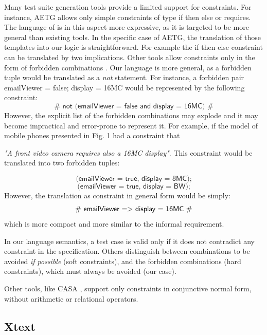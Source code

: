 \begin{tikzborder}{\cite{Gargantini16:validation}}
\begin{tikzborder}{\cite{gargantini_combinatorial_2017}}
\begin{tikzborder}{\cite{gargantini_combinatorial_2017}}
\begin{tikzborder}{\cite{garn2019}}
\begin{tikzborder}{\cite{arcaini2019achieving}}
\begin{tikzborder}{}
Many test suite generation tools provide a limited support for constraints. For instance, AETG \cite{AETG,Lott2005} allows only simple constraints of type \textsf{if then else} or \textsf{requires}. The language of \ctwedge is in this aspect more expressive, as it is targeted to be more general than existing tools. In the specific case of AETG, the translation of those templates into our logic is straightforward. For example the \textsf{if then else} constraint can be translated by two implications.
Other tools \cite{CohenISSTA07} allow constraints only in the form of forbidden combinations \cite{Golumbic:2011:GTC:2028636}. Our language is more general, as a forbidden tuple would be translated as a \textit{not} statement. For instance, a forbidden pair \textsf{emailViewer = false; display = 16MC} would be represented by the following constraint:
$$\textsf{\#\ not\ (emailViewer = false\ and\ display = 16MC)\ \#}$$
However, the explicit list of the forbidden combinations may explode and it may become impractical and error-prone to represent it. For example, if the model of mobile phones presented in Fig. 1 had a constraint that

\emph{"A front video camera requires also a 16MC display"}. This constraint would be translated into two forbidden tuples:

$$\textsf{(emailViewer = true, display = 8MC);}$$
$$\textsf{(emailViewer = true, display = BW);}$$
However, the translation as constraint in general form would be simply:
$$\textsf{\#\ emailViewer =\textgreater\ display = 16MC\ \#}$$
which is more compact and more similar to the informal requirement.

In our language semantics, a test case is valid only if it does not contradict any constraint in the specification. Others \cite{BRYCE2006960} distinguish between combinations to be avoided \textit{if possible} (soft constraints), and the forbidden combinations (hard constraints), which must always be avoided (our case). %

Other tools, like CASA \cite{CASAwebsite}, support only constraints in conjunctive normal form, without arithmetic or relational operators.
\end{tikzborder}

\subsection{Xtext}


\end{tikzborder}
\end{tikzborder}
\end{tikzborder}
\end{tikzborder}
\end{tikzborder}
